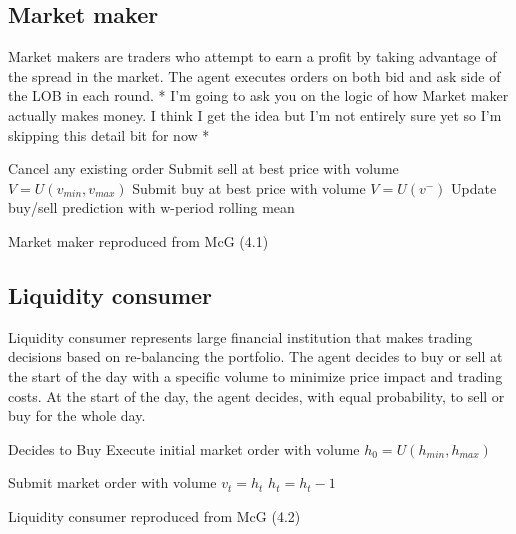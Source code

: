 \subsection{Market maker}
Market makers are traders who attempt to earn a profit by taking advantage of the spread in the market. The agent executes orders on both bid and ask side of the LOB in each round. * I'm going to ask you on the logic of how Market maker actually makes money. I think I get the idea but I'm not entirely sure yet so I'm skipping this detail bit for now * 

\begin{algorithm}[H]
\DontPrintSemicolon 
{} {
    Cancel any existing order\;
     {
    Submit sell at best price with volume $V=U(v_{min},v_{max})$\;
    Submit buy at best price with volume $V=U(v^{-})$\;
    }
    \EndIf
  }
\EndIf
Update buy/sell prediction with w-period rolling mean\; 
\caption{{\sc Market maker reproduced from McG (4.1) \cite{McGroarty}} }
\label{algo:max}
\end{algorithm}

\subsection{Liquidity consumer}
Liquidity consumer represents large financial institution that makes trading decisions based on re-balancing the portfolio. The agent decides to buy or sell at the start of the day with a specific volume to minimize price impact and trading costs. At the start of the day, the agent decides, with equal probability, to sell or buy for the whole day.

\begin{algorithm}[H]
\DontPrintSemicolon 
{} {
     {
    Decides to Buy\;
    }
    \EndIf
    Execute initial market order with volume $h_0 = U(h_{min},h_{max})$\;  
  }
\EndIf

 {
    \tcc{$h_t = $ is the remaining volume at time t}
     {
    Submit market order with volume $v_t = h_t$\;
    }
    \EndIf
    $h_t = h_t - 1$\;  
  }
\EndIf
\caption{{\sc Liquidity consumer reproduced from McG (4.2) \cite{McGroarty} }}
\label{algo:max}
\end{algorithm}

